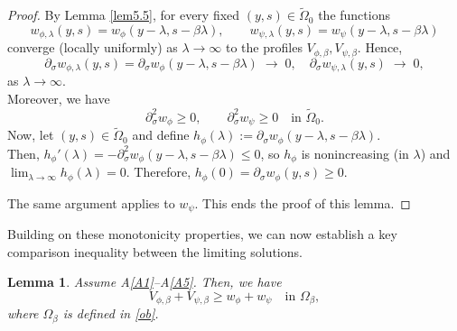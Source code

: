 \documentclass[
  sn-mathphys-num,
  colorlinks,
  linkcolor=darkmagenta,
  citecolor=rufous,
  urlcolor=zaffre,
  hypertexnames=false
]{sn-jnl}
\numberwithin{equation}{section}
\newtheorem{lemma}[theorem]{Lemma}%
\begin{document}
\begin{proof}
By Lemma \ref{lem5.5}, for every fixed $(y,s)\in\tilde{\Omega}_0$ the functions
$$
w_{\phi,\lambda}(y,s)=w_\phi(y-\lambda,s-\beta\lambda),\qquad
w_{\psi,\lambda}(y,s)=w_\psi(y-\lambda,s-\beta\lambda)
$$
converge (locally uniformly) as $\lambda\to\infty$ to the profiles $V_{\phi,\beta},V_{\psi,\beta}$. Hence,
$$
\partial_\sigma w_{\phi,\lambda}(y,s)=\partial_\sigma w_\phi(y-\lambda,s-\beta\lambda)\;\longrightarrow\;0,
\quad
\partial_\sigma w_{\psi,\lambda}(y,s)\;\longrightarrow\;0,
$$
as $\lambda\to\infty$.\\
Moreover, we have
$$
\partial_\sigma^2 w_\phi\ge 0,\qquad \partial_\sigma^2 w_\psi\ge 0 \quad \text{in }\tilde{\Omega}_0.
$$
Now, let \((y,s)\in\tilde{\Omega}_0\) and define $h_\phi(\lambda):=\partial_\sigma w_\phi(y-\lambda,s-\beta\lambda)$.\\ Then, $h_\phi'(\lambda)=-\partial_\sigma^2 w_\phi(y-\lambda,s-\beta\lambda)\le 0$, so $h_\phi$ is nonincreasing (in $\lambda$) and $\lim_{\lambda\to\infty}h_\phi(\lambda)=0$. Therefore, $h_\phi(0)=\partial_\sigma w_\phi(y,s)\ge 0$. 

The same argument applies to $w_\psi$. This ends the proof of this lemma.
\end{proof}
Building on these monotonicity properties, we can now establish a key comparison inequality between the limiting solutions.
\begin{lemma}\label{lem7.6}
Assume A\ref{A1}--A\ref{A5}. Then, we have
$$
V_{\phi, \beta} + V_{\psi, \beta} \geq w_\phi + w_\psi \quad \text{in } \Omega_\beta,
$$
where  $\Omega_\beta$ is defined in \eqref{ob}.
\end{lemma}
\end{document}
